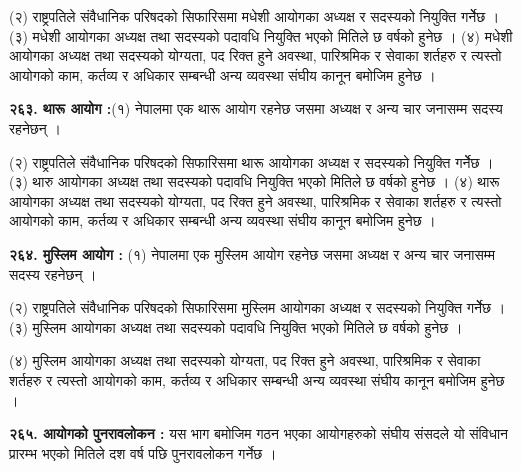 (२) राष्ट्रपतिले संवैधानिक परिषदको सिफारिसमा मधेशी आयोगका अध्यक्ष र सदस्यको नियुक्ति गर्नेेछ ।
(३) मधेशी आयोगका अध्यक्ष तथा सदस्यको पदावधि नियुक्ति भएको मितिले छ वर्षको हुनेछ ।
(४) मधेशी आयोगका अध्यक्ष तथा सदस्यको योग्यता, पद रिक्त हुने अवस्था, पारिश्रमिक र सेवाका शर्तहरु र त्यस्तो आयोगको काम, कर्तव्य र अधिकार सम्बन्धी अन्य व्यवस्था संघीय कानून बमोजिम हुनेछ ।

\textbf{२६३. थारू आयोग :}(१) नेपालमा एक थारू आयोग रहनेछ जसमा अध्यक्ष र अन्य चार जनासम्म सदस्य रहनेछन् ।

(२) राष्ट्रपतिले संवैधानिक परिषदको सिफारिसमा थारू आयोगका अध्यक्ष र सदस्यको नियुक्ति गर्नेेछ ।
(३) थारु आयोगका अध्यक्ष तथा सदस्यको पदावधि नियुक्ति भएको मितिले छ वर्षको हुनेछ ।
(४) थारू आयोगका अध्यक्ष तथा सदस्यको योग्यता, पद रिक्त हुने अवस्था, पारिश्रमिक र सेवाका शर्तहरु र त्यस्तो आयोगको काम, कर्तव्य र अधिकार सम्बन्धी अन्य व्यवस्था संघीय कानून बमोजिम हुनेछ ।

\textbf{२६४. मुस्लिम आयोग :} (१) नेपालमा एक मुस्लिम आयोग रहनेछ जसमा अध्यक्ष र अन्य चार जनासम्म सदस्य रहनेछन् ।

(२) राष्ट्रपतिले संवैधानिक परिषदको सिफारिसमा मुस्लिम आयोगका अध्यक्ष र सदस्यको नियुक्ति गर्नेेछ ।
(३) मुस्लिम आयोगका अध्यक्ष तथा सदस्यको पदावधि नियुक्ति भएको मितिले छ वर्षको हुनेछ ।

(४) मुस्लिम आयोगका अध्यक्ष तथा सदस्यको योग्यता, पद रिक्त हुने अवस्था, पारिश्रमिक र सेवाका शर्तहरु र त्यस्तो आयोगको काम, कर्तव्य र अधिकार सम्बन्धी अन्य व्यवस्था संघीय कानून बमोजिम हुनेछ ।

\textbf{२६५. आयोगको पुनरावलोकन :} यस भाग बमोजिम गठन भएका आयोगहरुको संघीय संसदले यो संविधान प्रारम्भ भएको मितिले दश वर्ष पछि पुनरावलोकन गर्नेछ ।

 
